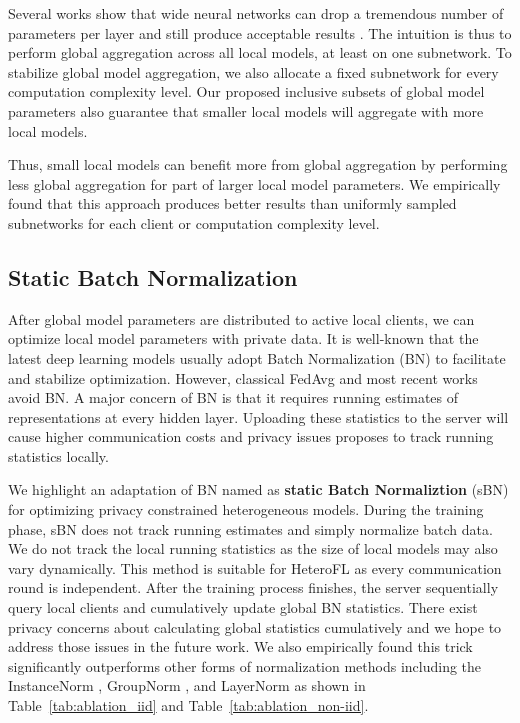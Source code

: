 \documentclass{article} %
\begin{document}
Several works show that wide neural networks can drop a tremendous number of parameters per layer and still produce acceptable results \citep{han2015deep,frankle2018lottery}. The intuition is thus to perform global aggregation across all local models, at least on one subnetwork. To stabilize global model aggregation, we also allocate a fixed subnetwork for every computation complexity level. Our proposed inclusive subsets of global model parameters also guarantee that smaller local models will aggregate with more local models. 


Thus, small local models can benefit more from global aggregation by performing less global aggregation for part of larger local model parameters. We empirically found that this approach produces better results than uniformly sampled subnetworks for each client or computation complexity level. 

\subsection{Static Batch Normalization}

After global model parameters are distributed to active local clients,  we can optimize local model parameters with private data. It is well-known that the latest deep learning models usually adopt Batch Normalization (BN) to facilitate and stabilize optimization. However, classical FedAvg and most recent works avoid BN. A major concern of BN is that it requires running estimates of representations at every hidden layer. Uploading these statistics to the server will cause higher communication costs and privacy issues \citet{andreux2020siloed} proposes to track running statistics locally. 

We highlight an adaptation of BN named as \textbf{static Batch Normaliztion} (sBN) for optimizing privacy constrained heterogeneous models. During the training phase, sBN does not track running estimates and simply normalize batch data. We do not track the local running statistics as the size of local models may also vary dynamically. This method is suitable for HeteroFL as every communication round is independent. After the training process finishes, the server sequentially query local clients and cumulatively update global BN statistics. There exist privacy concerns about calculating global statistics cumulatively and we hope to address those issues in the future work. We also empirically found this trick significantly outperforms other forms of normalization methods including the InstanceNorm \citep{ulyanov2016instance}, GroupNorm \citep{wu2018group}, and LayerNorm \citep{ba2016layer} as shown in Table~\ref{tab:ablation_iid} and Table~\ref{tab:ablation_non-iid}.
\end{document}
